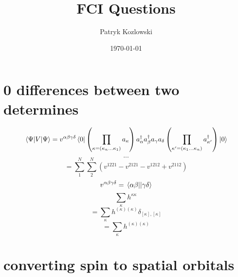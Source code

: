 \documentclass[12pt]{article}
\title{FCI Questions}
\author{Patryk Kozlowski}
\date{\today} %
\begin{document}
\maketitle
\section{0 differences between two determines}
\begin{equation}
    \mel{\Psi }{V}{\Psi }
    =v^{\alpha\beta\gamma\delta}\bra{0}\left(\prod_{\kappa=\left(\kappa_{n}\dots\kappa_{1}\right)}a_{\kappa}\right)
        a^{\dag}_{\alpha  }a^{\dag}_{\beta }a_{\gamma }a_{\delta }
    \left(\prod_{\kappa^{\prime}=\left(\kappa_{1}\dots\kappa_{n}\right)}a^{\dag}_{\kappa^{\prime}}\right)\ket{0}
\end{equation}
\begin{equation}
    ...
\end{equation}
\begin{equation}
    =\sum_{1}^{N} \sum_{2}^{N} \left(v^{1221}-v^{2121}-v^{1212}+v^{2112}\right)
\end{equation}
\begin{equation}
    v^{\alpha \beta \gamma  \delta }=\mel{\alpha \beta }{}{\gamma \delta }
\end{equation}
\begin{equation}
    \sum_{\kappa } h^{\kappa \kappa }
\end{equation}
\begin{equation}
    =\sum_{\kappa } h^{(\kappa )(\kappa )}\delta _{[\kappa ],[\kappa ]}
\end{equation}
\begin{equation}
    =\sum_{\kappa } h^{(\kappa )(\kappa )}
\end{equation}
\section{converting spin to spatial orbitals}
\end{document}
